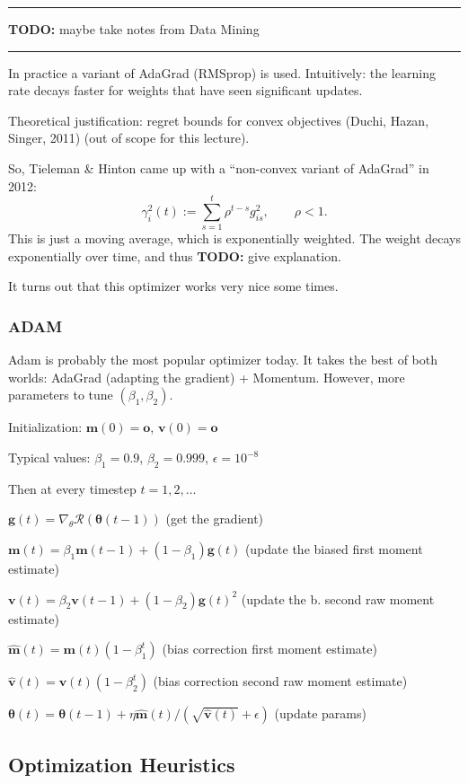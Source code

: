 \documentclass[a2paper,8pt]{extarticle}
\newcommand{\cR}{\mathcal{R}}
\renewcommand{\vec}[1]{\mathbf{#1}}
\newcommand{\vg}{\vec{g}}
\newcommand{\vm}{\vec{m}}
\newcommand{\vo}{\vec{o}}
\newcommand{\vv}{\vec{v}}
\newcommand{\vtheta}{\boldsymbol{\theta}}
\newcommand{\todo}[1]{\textbf{TODO:} #1}
\newcommand{\todo}[1]{%
}
\newcommand{\sep}{\vspace{0pt}\noindent\hrule\vspace{0pt}}
\newcommand{\sep}{\vspace{5pt}\noindent\hrule\vspace{5pt}}
\begin{document}
\begin{landscape}
\begin{multicols*}{7}
\sep

\todo{maybe take notes from Data Mining}

\sep

In practice a variant of AdaGrad (RMSprop) is used. Intuitively: the learning
rate decays faster for weights that have seen significant updates.

Theoretical justification: regret bounds for convex objectives (Duchi, Hazan,
Singer, 2011) (out of scope for this lecture).

So, Tieleman \& Hinton came up with a ``non-convex variant of AdaGrad'' in 2012:
\[
\gamma_i^2(t):=\sum_{s=1}^t\rho^{t-s}g_{is}^2,
\qquad
\rho<1.
\]
This is just a moving average, which is exponentially weighted. The weight
decays exponentially over time, and thus \todo{give explanation}.

It turns out that this optimizer works very nice some times.

\subsubsection{ADAM}

Adam is probably the most popular optimizer today. It takes the best of both
worlds: AdaGrad (adapting the gradient) + Momentum. However, more parameters to
tune $(\beta_1,\beta_2)$.

Initialization: $\vm(0)=\vo$, $\vv(0)=\vo$

Typical values: $\beta_1=0.9$, $\beta_2=0.999$, $\epsilon=10^{-8}$

Then at every timestep $t=1,2,\ldots$

$\vg(t)=\nabla_{\theta}\cR(\vtheta(t-1))$ (get the gradient)

$\vm(t)=\beta_1 \vm(t-1)+(1-\beta_1)\vg(t)$ (update the biased first moment
estimate)

$\vv(t)=\beta_2 \vv(t-1)+(1-\beta_2)\vg(t)^2$ (update the b. second raw moment
estimate)

$\hat{\vm}(t)=\vm(t)(1-\beta_1^t)$ (bias correction first moment estimate)

$\hat{\vv}(t)=\vv(t)(1-\beta_2^t)$ (bias correction second raw moment estimate)

$\vtheta(t)=\vtheta(t-1)+\eta\hat{\vm}(t)/(\sqrt{\hat{\vv}(t)}+\epsilon)$
(update params)

\subsection{Optimization Heuristics}


\end{multicols*}
\end{landscape}
\end{document}
